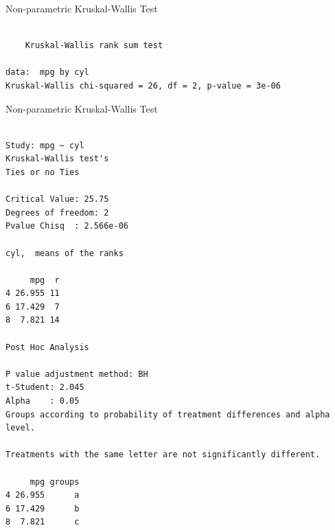 \begin{frame}[fragile]{Non-parametric Kruskal-Wallis Test}

\begin{Shaded}
\begin{Highlighting}[]
\OperatorTok{~}
\end{Highlighting}
\end{Shaded}

\begin{verbatim}

    Kruskal-Wallis rank sum test

data:  mpg by cyl
Kruskal-Wallis chi-squared = 26, df = 2, p-value = 3e-06
\end{verbatim}

\end{frame}

\begin{frame}[fragile]{Non-parametric Kruskal-Wallis Test}

\begin{Shaded}
\begin{Highlighting}[]
\OperatorTok{::}\NormalTok{, } \NormalTok{))}
\end{Highlighting}
\end{Shaded}

\begin{verbatim}

Study: mpg ~ cyl
Kruskal-Wallis test's
Ties or no Ties

Critical Value: 25.75
Degrees of freedom: 2
Pvalue Chisq  : 2.566e-06 

cyl,  means of the ranks

     mpg  r
4 26.955 11
6 17.429  7
8  7.821 14

Post Hoc Analysis

P value adjustment method: BH
t-Student: 2.045
Alpha    : 0.05
Groups according to probability of treatment differences and alpha level.

Treatments with the same letter are not significantly different.

     mpg groups
4 26.955      a
6 17.429      b
8  7.821      c
\end{verbatim}

\end{frame}


